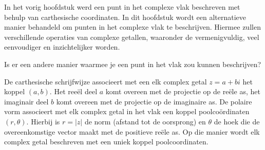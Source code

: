 \documentclass{ximera}
\begin{document}
    \author{Wiskunde Op Maat }
     
    \label{xim:complexe_getallen_polair}  %
 



In het vorig hoofdstuk werd een punt in het complexe vlak beschreven met behulp van carthesische coordinaten.  In dit hoofdstuk wordt een alternatieve manier behandeld om punten in het complexe vlak te beschrijven. Hiermee zullen verschillende operaties van complexe getallen, waaronder de vermenigvuldig, veel eenvoudiger en inzichtelijker worden. 

\begin{quickquestion*}{}
    Is er een andere manier waarmee je een punt in het vlak zou kunnen beschrijven? 
\end{quickquestion*}

 
De carthesische schrijfwijze associeert met een elk complex getal $z=a+bi$ het koppel \((a, b)\). Het reeël deel \(a\) komt overeen met de projectie op de reële as, het imaginair deel \(b\) komt overeen met de projectie op de imaginaire as. De polaire vorm associeert met elk complex getal in het vlak een koppel poolcoördinaten \((r, \theta)\).  Hierbij is $r=|z|$ de norm (afstand tot de oorsprong) en $\theta$ de hoek die de overeenkomstige vector maakt met de positieve reële as. Op die manier wordt elk complex getal beschreven met een uniek koppel poolcoordinaten. 
\end{document}
